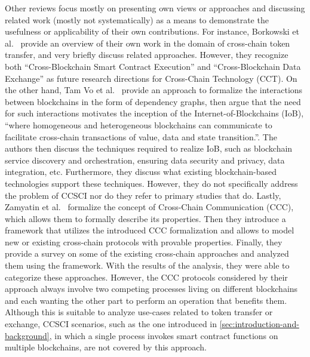 \documentclass[review]{elsarticle}
\begin{document}
Other reviews focus mostly on presenting own views or approaches and discussing related work (mostly not systematically) as a means to demonstrate the usefulness or applicability of their own contributions.
For instance, Borkowski et al.~\cite{Borkowski2019} provide an overview of their own work in the domain of cross-chain token transfer, and very briefly discuss related approaches.
However, they recognize both \enquote{Cross-Blockchain Smart Contract Execution} and \enquote{Cross-Blockchain Data Exchange} as future research directions for Cross-Chain Technology (CCT).
On the other hand, Tam Vo et al.~\cite{TamVo2018InternetOfBlockchain} provide an approach to formalize the interactions between blockchains in the form of dependency graphs, then argue that the need for such interactions motivates the inception of the Internet-of-Blockchains (IoB), \enquote{where homogeneous and heterogeneous blockchains can communicate to facilitate cross-chain transactions of value, data and state transition.}.
The authors then discuss the techniques required to realize IoB, such as blockchain service discovery and orchestration, ensuring data security and privacy, data integration, etc.
Furthermore, they discuss what existing blockchain-based technologies support these techniques.
However, they do not specifically address the problem of CCSCI nor do they refer to primary studies that do.
Lastly, Zamyatin et al.~\cite{Zamyatin2019SoKCA} formalize the concept of Cross-Chain Communication (CCC), which allows them to formally describe its properties.
Then they introduce a framework that utilizes the introduced CCC formalization and allows to model new or existing cross-chain protocols with provable properties.
Finally, they provide a survey on some of the existing cross-chain approaches and analyzed them using the framework.
With the results of the analysis, they were able to categorize these approaches.
However, the CCC protocols considered by their approach always involve two competing processes living on different blockchains and each wanting the other part to perform an operation that benefits them.
Although this is suitable to analyze use-cases related to token transfer or exchange, CCSCI scenarios, such as the one introduced in \cref{sec:introduction-and-background}, in which a single process invokes smart contract functions on multiple blockchains, are not covered by this approach.
\end{document}
